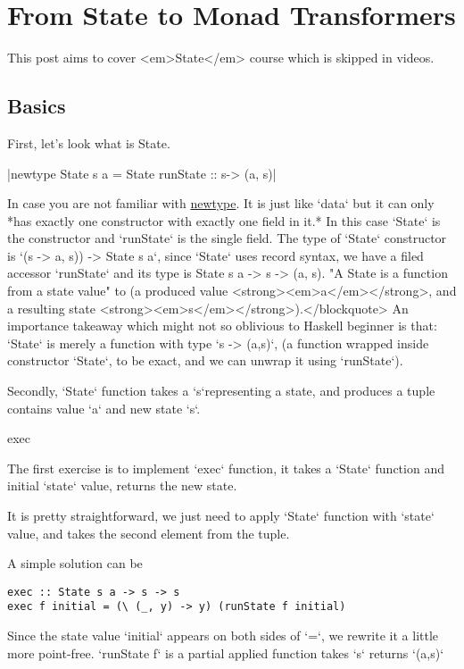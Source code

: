 \chapter{From State to Monad Transformers}

This post aims to cover <em>State</em> course which is skipped in videos.

\section{Basics}

First, let's look what is State.

|newtype State s a = State { runState :: s-> (a, s)}|


In case you are not familiar with \href{https://wiki.haskell.org/Newtype}{newtype}.
It is just like `data` but it can only *has exactly one constructor with exactly one field in it.* In this case `State` is the constructor and `runState` is the single field. The type of `State` constructor is `(s ->  a, s)) -> State s a`, since `State` uses record syntax, we have a filed accessor `runState` and its type is State s a -> s -> (a, s).
"A State is a function from a state value" to (a produced value <strong><em>a</em></strong>, and a resulting state <strong><em>s</em></strong>).</blockquote>
An importance takeaway which might not so oblivious to Haskell beginner is that: `State` is merely a function with type `s -> (a,s)`, (a function wrapped inside constructor `State`, to be exact, and we can unwrap it using `runState`).

Secondly, `State` function takes a `s`representing a state, and produces a tuple contains value `a` and new state `s`.

 exec

The first exercise is to implement `exec` function, it takes a `State` function and initial `state` value, returns the new state.

It is pretty straightforward, we just need to apply `State` function with `state` value, and takes the second  element from the tuple.

A simple solution can be

\begin{verbatim}
exec :: State s a -> s -> s
exec f initial = (\ (_, y) -> y) (runState f initial)
\end{verbatim}

Since the state value `initial` appears on both sides of `=`, we rewrite it a little more point-free. `runState f` is a partial applied function takes `s` returns `(a,s)`

